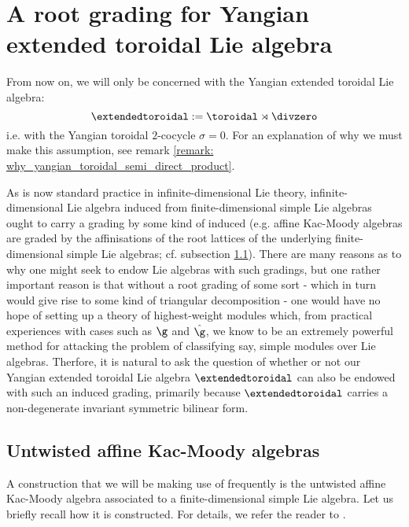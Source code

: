 \section{A root grading for Yangian extended toroidal Lie algebra} \label{section: root_grading_for_yangian_EALAs}
    From now on, we will only be concerned with the Yangian extended toroidal Lie algebra:
        $$\extendedtoroidal := \toroidal \rtimes \divzero$$
    i.e. with the Yangian toroidal $2$-cocycle $\sigma = 0$. For an explanation of why we must make this assumption, see remark \ref{remark: why_yangian_toroidal_semi_direct_product}.

    As is now standard practice in infinite-dimensional Lie theory, infinite-dimensional Lie algebra induced from finite-dimensional simple Lie algebras ought to carry a grading by some kind of induced  (e.g. affine Kac-Moody algebras are graded by the affinisations of the root lattices of the underlying finite-dimensional simple Lie algebras; cf. subsection \ref{subsection: a_fixed_untwisted_affine_kac_moody_algebra}). There are many reasons as to why one might seek to endow Lie algebras with such gradings, but one rather important reason is that without a root grading of some sort - which in turn would give rise to some kind of triangular decomposition - one would have no hope of setting up a theory of highest-weight modules which, from practical experiences with cases such as $\g$ and $\hat{\g}$, we know to be an extremely powerful method for attacking the problem of classifying say, simple modules over Lie algebras. Therfore, it is natural to ask the question of whether or not our Yangian extended toroidal Lie algebra $\extendedtoroidal$ can also be endowed with such an induced grading, primarily because $\extendedtoroidal$ carries a non-degenerate invariant symmetric bilinear form.

    \subsection{Untwisted affine Kac-Moody algebras} \label{subsection: a_fixed_untwisted_affine_kac_moody_algebra}
        A construction that we will be making use of frequently is the untwisted affine Kac-Moody algebra associated to a finite-dimensional simple Lie algebra. Let us briefly recall how it is constructed. For details, we refer the reader to \cite[Chapters 6 and 7]{kac_infinite_dimensional_lie_algebras}.

